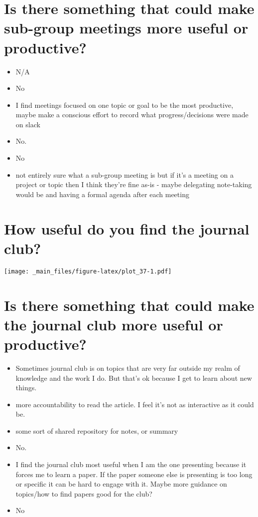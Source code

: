 \documentclass[
]{book}
\providecommand{\tightlist}{%
  \setlength{\itemsep}{0pt}\setlength{\parskip}{0pt}}
\begin{document}
\hypertarget{is-there-something-that-could-make-sub-group-meetings-more-useful-or-productive}{%
\section{Is there something that could make sub-group meetings more useful or productive?}\label{is-there-something-that-could-make-sub-group-meetings-more-useful-or-productive}}

\begin{itemize}
\tightlist
\item
  N/A
\item
  No
\item
  I find meetings focused on one topic or goal to be the most productive, maybe make a conscious effort to record what progress/decisions were made on slack
\item
  No.
\item
  No
\item
  not entirely sure what a sub-group meeting is but if it's a meeting on a project or topic then I think they're fine as-is - maybe delegating note-taking would be and having a formal agenda after each meeting
\end{itemize}

\hypertarget{how-useful-do-you-find-the-journal-club}{%
\section{How useful do you find the journal club?}\label{how-useful-do-you-find-the-journal-club}}

\texttt{[image: \_main\_files/figure-latex/plot\_37-1.pdf]}

\hypertarget{is-there-something-that-could-make-the-journal-club-more-useful-or-productive}{%
\section{Is there something that could make the journal club more useful or productive?}\label{is-there-something-that-could-make-the-journal-club-more-useful-or-productive}}

\begin{itemize}
\tightlist
\item
  Sometimes journal club is on topics that are very far outside my realm of knowledge and the work I do. But that's ok because I get to learn about new things.
\item
  more accountability to read the article. I feel it's not as interactive as it could be.
\item
  some sort of shared repository for notes, or summary
\item
  No.
\item
  I find the journal club most useful when I am the one presenting because it forces me to learn a paper. If the paper someone else is presenting is too long or specific it can be hard to engage with it. Maybe more guidance on topics/how to find papers good for the club?
\item
  No
\end{itemize}
\end{document}
